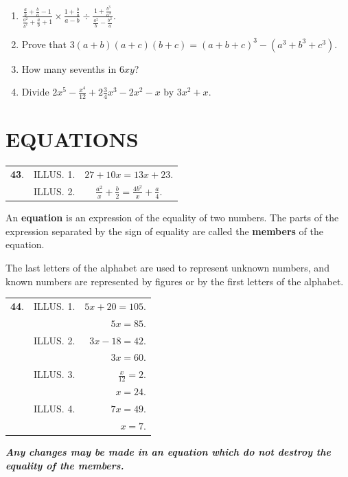 \documentclass{book}
\begin{document}
\begin{enumerate}
\item $\displaystyle \frac{\frac{a}{b} + \frac{b}{a} -
1}{\frac{a^2}{b^2} + \frac{a}{b} + 1} \times \frac{1 +
\frac{b}{a}}{a - b} \div \frac{1 + \frac{b^3}{a^3}}{\frac{a^2}{b}
- \frac{b^2}{a}}$.

\item Prove that $3(a + b)(a + c)(b + c) = (a + b + c)^3 - (a^3 +
b^3 + c^3)$.

\item How many sevenths in $6xy$?

\item Divide $\displaystyle 2x^5 - \frac{x^4}{12} +
2\frac{3}{4}x^3 - 2x^2 - x$ by $3x^2 + x$.
\end{enumerate}

\chapter*{EQUATIONS}


\begin{tabular}{llc}
\textbf{43}.& ILLUS. 1.& $27 + 10x = 13x + 23$.\\
&ILLUS. 2. & $\displaystyle \frac{a^2}{x} + \frac{b}{2} =
\frac{4b^2}{x} +
\frac{a}{4}$.\\
\end{tabular}

An \textbf{equation} is an expression of the equality of two
numbers. The parts of the expression separated by the
sign of equality are called the \textbf{members} of the equation.

The last letters of the alphabet are used to represent
unknown numbers, and known numbers are represented by
figures or by the first letters of the alphabet.

\begin{tabular}{lcr}
\textbf{44}. &ILLUS. 1. & $5x+20 = 105$. \\
&& $5x=85$. \\
&ILLUS. 2. & $3x-18=42$. \\
&& $3x=60$.\\
&ILLUS. 3. & $\frac{x}{12}=2$. \\
&& $x=24$.\\
&ILLUS. 4. &$7x=49$.\\
&& $x=7$. \\
\end{tabular}

\textbf{\textit{Any changes may be made in an equation which do
not destroy the equality of the members.}}
\end{document}
